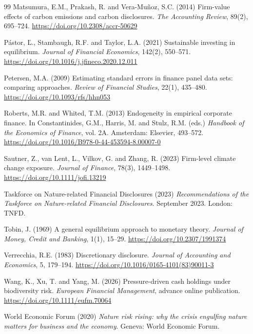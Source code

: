 \documentclass[12pt,a4paper]{article}
\begin{document}
\begin{thebibliography}{99}
 Matsumura, E.M., Prakash, R. and Vera-Mu\~noz, S.C. (2014) Firm-value effects of carbon emissions and carbon disclosures. \emph{The Accounting Review}, 89(2), 695--724. \url{https://doi.org/10.2308/accr-50629}

 P\'astor, {\selectfont\v{L}}., Stambaugh, R.F. and Taylor, L.A. (2021) Sustainable investing in equilibrium. \emph{Journal of Financial Economics}, 142(2), 550--571. \url{https://doi.org/10.1016/j.jfineco.2020.12.011}

 Petersen, M.A. (2009) Estimating standard errors in finance panel data sets: comparing approaches. \emph{Review of Financial Studies}, 22(1), 435--480. \url{https://doi.org/10.1093/rfs/hhn053}

 Roberts, M.R. and Whited, T.M. (2013) Endogeneity in empirical corporate finance. In Constantinides, G.M., Harris, M. and Stulz, R.M. (eds.) \emph{Handbook of the Economics of Finance}, vol. 2A. Amsterdam: Elsevier, 493--572. \url{https://doi.org/10.1016/B978-0-44-453594-8.00007-0}

 Sautner, Z., van Lent, L., Vilkov, G. and Zhang, R. (2023) Firm-level climate change exposure. \emph{Journal of Finance}, 78(3), 1449--1498. \url{https://doi.org/10.1111/jofi.13219}

 Taskforce on Nature-related Financial Disclosures (2023) \emph{Recommendations of the Taskforce on Nature-related Financial Disclosures}. September 2023. London: TNFD.

 Tobin, J. (1969) A general equilibrium approach to monetary theory. \emph{Journal of Money, Credit and Banking}, 1(1), 15--29. \url{https://doi.org/10.2307/1991374}

 Verrecchia, R.E. (1983) Discretionary disclosure. \emph{Journal of Accounting and Economics}, 5, 179--194. \url{https://doi.org/10.1016/0165-4101(83)90011-3}

 Wang, K., Xu, T. and Yang, M. (2026) Pressure-driven cash holdings under biodiversity risk. \emph{European Financial Management}, advance online publication. \url{https://doi.org/10.1111/eufm.70064}

 World Economic Forum (2020) \emph{Nature risk rising: why the crisis engulfing nature matters for business and the economy}. Geneva: World Economic Forum.

\end{thebibliography}
\end{document}
